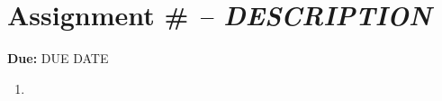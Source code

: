 \section{Assignment # \textit{-- DESCRIPTION}}\label{Assignments::X}
\textbf{Due:} DUE DATE \\
\begin{enumerate}
    \item
\end{enumerate}